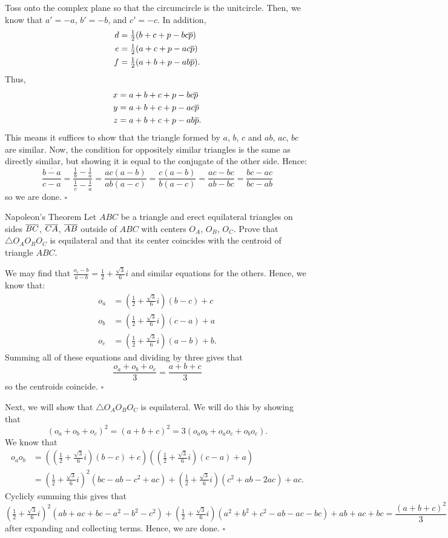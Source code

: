 \documentclass{article}
\begin{document}
Toss onto the complex plane so that the circumcircle is the unitcircle. Then, we know that $a' = -a$, $b' = -b$, and $c' = -c$. In addition, 
\begin{align*}
d &= \tfrac{1}{2}(b+c+p-bc\overline{p}) \\
e &= \tfrac{1}{2}(a+c+p-ac\overline{p}) \\
f &= \tfrac{1}{2}(a+b+p-ab\overline{p}).
\end{align*}
Thus,
\begin{align*}
x &= a+b+c+p-bc\overline{p} \\
y &= a+b+c+p-ac\overline{p} \\
z &= a+b+c+p-ab\overline{p}.
\end{align*}
This means it suffices to show that the triangle formed by $a$, $b$, $c$ and $ab$, $ac$, $bc$ are similar. Now, the condition for oppositely similar triangles is the same as directly similar, but showing it is equal to the conjugate of the other side. Hence: \[\overline{\dfrac{b-a}{c-a}} = \dfrac{\tfrac{1}{b}-\tfrac{1}{a}}{\tfrac{1}{c}-\tfrac{1}{a}} = \dfrac{ac(a-b)}{ab(a-c)} = \dfrac{c(a-b)}{b(a-c)} = \dfrac{ac-bc}{ab-bc} = \dfrac{bc-ac}{bc-ab}\] so we are done. $\square$

\begin{problem}[6.34]{Napoleon's Theorem}
Let $ABC$ be a triangle and erect equilateral triangles on sides $\overline{BC}$, $\overline{CA}$, $\overline{AB}$ outside of $ABC$ with centers $O_A$, $O_B$, $O_C$. Prove that $\triangle O_AO_BO_C$ is equilateral and that its center coincides with the centroid of triangle $ABC$.
\end{problem}

We may find that $\tfrac{o_c-b}{a-b} = \tfrac{1}{2}+\tfrac{\sqrt{3}}{6}i$ and similar equations for the others. Hence, we know that:
\begin{align*}
o_a &= (\tfrac{1}{2}+\tfrac{\sqrt{3}}{6}i)(b-c)+c \\
o_b &= (\tfrac{1}{2}+\tfrac{\sqrt{3}}{6}i)(c-a)+a \\
o_c &= (\tfrac{1}{2}+\tfrac{\sqrt{3}}{6}i)(a-b)+b.
\end{align*}
Summing all of these equations and dividing by three gives that \[\dfrac{o_a+o_b+o_c}{3} = \dfrac{a+b+c}{3}\] so the centroids coincide. $\square$

Next, we will show that $\triangle O_AO_BO_C$ is equilateral. We will do this by showing that \[(o_a+o_b+o_c)^2 = (a+b+c)^2 = 3(o_ao_b+o_ao_c+o_bo_c).\] We know that 
\begin{align*}
o_ao_b &= \left(\left(\tfrac{1}{2}+\tfrac{\sqrt{3}}{6}i\right)(b-c)+c\right)\left(\left(\tfrac{1}{2}+\tfrac{\sqrt{3}}{6}i\right)\left(c-a\right)+a\right) \\
&= \left(\tfrac{1}{2}+\tfrac{\sqrt{3}}{6}i\right)^2(bc-ab-c^2+ac)+\left(\tfrac{1}{2}+\tfrac{\sqrt{3}}{6}i\right)(c^2+ab-2ac)+ac.
\end{align*}
Cyclicly summing this gives that \[\left(\tfrac{1}{2}+\tfrac{\sqrt{3}}{6}i\right)^2(ab+ac+bc-a^2-b^2-c^2)+\left(\tfrac{1}{2}+\tfrac{\sqrt{3}}{6}i\right)(a^2+b^2+c^2-ab-ac-bc)+ab+ac+bc = \dfrac{(a+b+c)^2}{3}\] after expanding and collecting terms. Hence, we are done. $\square$
\end{document}

